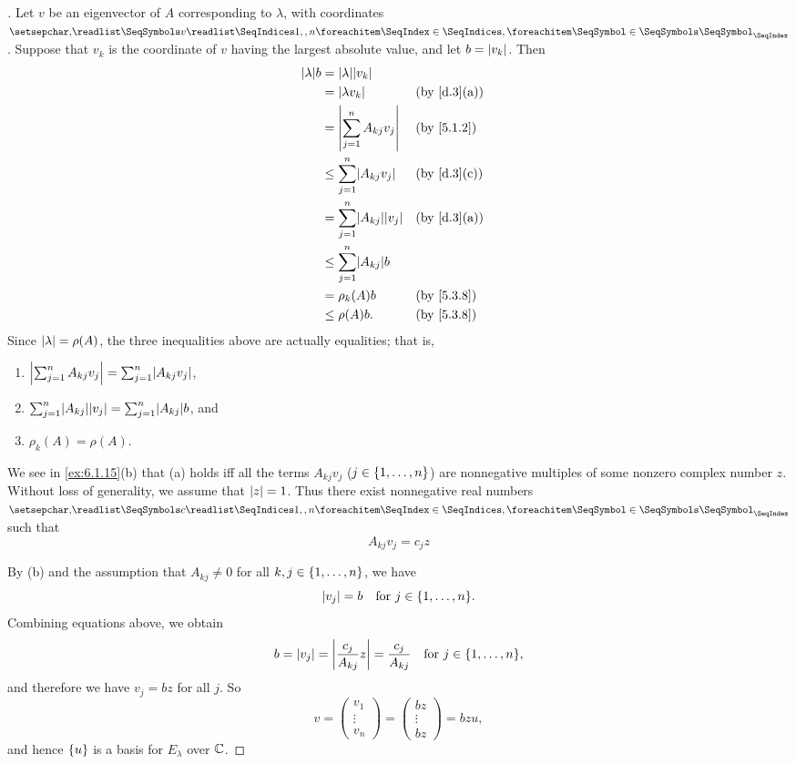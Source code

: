 \begin{proof}[]
	Let \(v\) be an eigenvector of \(A\) corresponding to \(\lambda\), with coordinates \(\seq{v}{1,,n}\).
	Suppose that \(v_k\) is the coordinate of \(v\) having the largest absolute value, and let \(b = \left\lvert v_k\right\rvert\).
	Then
	\begin{align*}
		\abs{\lambda} b & = \abs{\lambda} \abs{v_k}                                 \\
		                & = \abs{\lambda v_k}                      &  & \by{d.3}[a] \\
		                & = \abs{\sum_{j = 1}^n A_{k j} v_j}       &  & \by{5.1.2}  \\
		                & \leq \sum_{j = 1}^n \abs{A_{k j} v_j}    &  & \by{d.3}[c] \\
		                & = \sum_{j = 1}^n \abs{A_{k j}} \abs{v_j} &  & \by{d.3}[a] \\
		                & \leq \sum_{j = 1}^n \abs{A_{k j}} b                       \\
		                & = \rho_k(A) b                            &  & \by{5.3.8}  \\
		                & \leq \rho(A) b.                          &  & \by{5.3.8}
	\end{align*}
	Since \(\left\lvert\lambda\right\rvert = \rho(A)\), the three inequalities above are actually equalities;
	that is,
	\begin{enumerate}
		\item \(\abs{\sum_{j = 1}^n A_{k j} v_j} = \sum_{j = 1}^n \abs{A_{k j} v_j}\),
		\item \(\sum_{j = 1}^n \abs{A_{k j}} \abs{v_j} = \sum_{j = 1}^n \abs{A_{k j}} b\), and
		\item \(\rho_k(A) = \rho(A)\).
	\end{enumerate}

	We see in \cref{ex:6.1.15}(b) that (a) holds iff all the terms \(A_{k j} v_j\) (\(j \in \left\lbrace1, \dots, n\right\rbrace\)) are nonnegative multiples of some nonzero complex number \(z\).
	Without loss of generality, we assume that \(\left\lvert z\right\rvert = 1\).
	Thus there exist nonnegative real numbers \(\seq{c}{1,,n}\) such that
	\[
		A_{k j} v_j = c_j z
	\]

	By (b) and the assumption that \(A_{k j} \neq 0\) for all \(k, j \in \left\lbrace1, \dots, n\right\rbrace\), we have
	\[
		\abs{v_j} = b \quad \text{for } j \in \set{1, \dots, n}.
	\]
	Combining equations above, we obtain
	\[
		b = \abs{v_j} = \abs{\frac{c_j}{A_{k j}} z} = \frac{c_j}{A_{k j}} \quad \text{for } j \in \set{1, \dots, n},
	\]
	and therefore we have \(v_j = bz\) for all \(j\).
	So
	\[
		v = \begin{pmatrix}
			v_1    \\
			\vdots \\
			v_n
		\end{pmatrix} = \begin{pmatrix}
			bz     \\
			\vdots \\
			bz
		\end{pmatrix} = bzu,
	\]
	and hence \(\left\lbrace u\right\rbrace\) is a basis for \(E_{\lambda}\) over \(\mathbb{C}\).


\end{proof}
